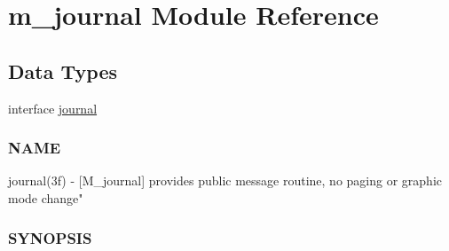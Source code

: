 \hypertarget{namespacem__journal}{}\section{m\+\_\+journal Module Reference}
\label{namespacem__journal}
\subsection*{Data Types}
\begin{DoxyCompactItemize}
\item 
interface \hyperlink{interfacem__journal_1_1journal}{journal}
\begin{DoxyCompactList}\small\item\em \subsubsection*{N\+A\+ME}

journal(3f) -\/ \mbox{[}M\+\_\+journal\mbox{]} provides public message routine, no paging or graphic mode change" \subsubsection*{S\+Y\+N\+O\+P\+S\+IS}\end{DoxyCompactList}\end{DoxyCompactItemize}
